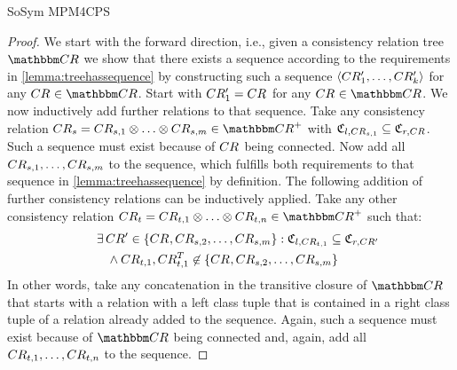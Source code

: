 \begin{copiedFrom}{SoSym MPM4CPS}
\begin{proof}
    We start with the forward direction, i.e., given a consistency relation tree $\consistencyrelationset{CR}$ we show that there exists a sequence according to the requirements in \autoref{lemma:treehassequence} by constructing such a sequence $\langle CR'_{1}, \dots, CR'_{k} \rangle$ for any $\consistencyrelation{CR}{} \in \consistencyrelationset{CR}$.
    Start with $CR'_{1} = CR_{}$ for any $\consistencyrelation{CR}{} \in \consistencyrelationset{CR}$.
    We now inductively add further relations to that sequence.
    Take any consistency relation $\consistencyrelation{CR}{s} = \consistencyrelation{CR}{s,1} \concat \dots \concat \consistencyrelation{CR}{s,m} \in \transitiveclosure{\consistencyrelationset{CR}}$ with $\mathfrak{C}_{l,CR_{s,1}} \subseteq \mathfrak{C}_{r,CR_{}}$. Such a sequence must exist because of $CR_{}$ being connected.
    Now add all $CR_{s,1}, \dots, CR_{s,m}$ to the sequence, which fulfills both requirements to that sequence in \autoref{lemma:treehassequence} by definition.
    The following addition of further consistency relations can be inductively applied.
    Take any other consistency relation $\consistencyrelation{CR}{t} = \consistencyrelation{CR}{t,1} \concat \dots \concat \consistencyrelation{CR}{t,n} \in \transitiveclosure{\consistencyrelationset{CR}}$ such that:
    \begin{align*}
        \formulaskip &
        \exists \consistencyrelation{CR'}{} \in \setted{\consistencyrelation{CR}{}, \consistencyrelation{CR}{s,2}, \dots, \consistencyrelation{CR}{s,m}} :
        \classtuple{C}{l,\consistencyrelation{CR}{t,1}} \subseteq \classtuple{C}{r,\consistencyrelation{CR'}{}}\\
        & \formulaskip
        \land
        \consistencyrelation{CR}{t,1}, \consistencyrelation{CR^T}{t,1} \not\in \setted{\consistencyrelation{CR}{}, \consistencyrelation{CR}{s,2}, \dots, \consistencyrelation{CR}{s,m}}
    \end{align*}
    In other words, take any concatenation in the transitive closure of $\consistencyrelationset{CR}$ that starts with a relation with a left class tuple that is contained in a right class tuple of a relation already added to the sequence.
    Again, such a sequence must exist because of $\consistencyrelationset{CR}$ being connected and, again, add all $CR_{t,1}, \dots, CR_{t,n}$ to the sequence.

\end{proof}
\end{copiedFrom}
